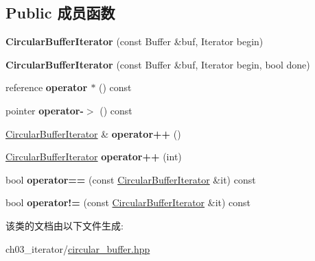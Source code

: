 \subsection*{Public 成员函数}
\begin{DoxyCompactItemize}
\item 
\mbox{\label{class_circular_buffer_1_1_circular_buffer_iterator_a9cb84bad160f450993507c8920458778}} 
{\bfseries Circular\+Buffer\+Iterator} (const Buffer \&buf, Iterator begin)
\item 
\mbox{\label{class_circular_buffer_1_1_circular_buffer_iterator_a48b1374153668dd2fa8b30b995054e87}} 
{\bfseries Circular\+Buffer\+Iterator} (const Buffer \&buf, Iterator begin, bool done)
\item 
\mbox{\label{class_circular_buffer_1_1_circular_buffer_iterator_a571a7a1d3ef9240ab680fa0b59838c05}} 
reference {\bfseries operator $\ast$} () const
\item 
\mbox{\label{class_circular_buffer_1_1_circular_buffer_iterator_ac70270ed73c69b8cfae64ad514595ca8}} 
pointer {\bfseries operator-\/$>$} () const
\item 
\mbox{\label{class_circular_buffer_1_1_circular_buffer_iterator_aae78bc1f4eaea72e3be9d839af3f3b0d}} 
\mbox{\hyperlink{class_circular_buffer_1_1_circular_buffer_iterator}{Circular\+Buffer\+Iterator}} \& {\bfseries operator++} ()
\item 
\mbox{\label{class_circular_buffer_1_1_circular_buffer_iterator_a44ff1b85476aae6ff341021bbe53849e}} 
\mbox{\hyperlink{class_circular_buffer_1_1_circular_buffer_iterator}{Circular\+Buffer\+Iterator}} {\bfseries operator++} (int)
\item 
\mbox{\label{class_circular_buffer_1_1_circular_buffer_iterator_a8f823c77930882b99eb73936ab4d8f24}} 
bool {\bfseries operator==} (const \mbox{\hyperlink{class_circular_buffer_1_1_circular_buffer_iterator}{Circular\+Buffer\+Iterator}} \&it) const
\item 
\mbox{\label{class_circular_buffer_1_1_circular_buffer_iterator_afb5e165997286ad5c5f86ffda208a701}} 
bool {\bfseries operator!=} (const \mbox{\hyperlink{class_circular_buffer_1_1_circular_buffer_iterator}{Circular\+Buffer\+Iterator}} \&it) const
\end{DoxyCompactItemize}


该类的文档由以下文件生成\+:\begin{DoxyCompactItemize}
\item 
ch03\+\_\+iterator/\mbox{\hyperlink{ch03__iterator_2circular__buffer_8hpp}{circular\+\_\+buffer.\+hpp}}\end{DoxyCompactItemize}

